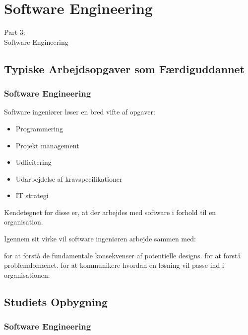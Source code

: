 {
\renewcommand{\bgcolor}{se}

\section{Software Engineering}
\begin{frame}
    \vspace{25mm}
    \begin{center}
        \Huge{Part 3:\\Software Engineering}
    \end{center}
\end{frame}

\subsection{Typiske Arbejdsopgaver som Færdiguddannet}
\begin{frame}[fragile]
  \frametitle{Software Engineering }
  \vspace{1mm}
  Software ingeniører løser en bred vifte af opgaver:
  \begin{itemize}
    \item Programmering
    \item Projekt management
    \item Udlicitering
    \item Udarbejdelse af kravspecifikationer
    \item IT strategi
  \end{itemize}
  
  \pause
  \vspace{3mm}
  Kendetegnet for disse er, at der arbejdes med software i forhold til en organisation.
  
  \pause
  \vspace{3mm}
  Igennem sit virke vil software ingeniøren arbejde sammen med:
  \begin{itemize}
     for at forstå de fundamentale konsekvenser af potentielle designs.
     for at forstå problemdomænet.
     for at kommunikere hvordan en løsning vil passe ind i organisationen.
  \end{itemize}
\end{frame}

\subsection{Studiets Opbygning}
\begin{frame}[fragile]
  \frametitle{Software Engineering }
  \vspace{-2mm}
  

\end{frame}}
